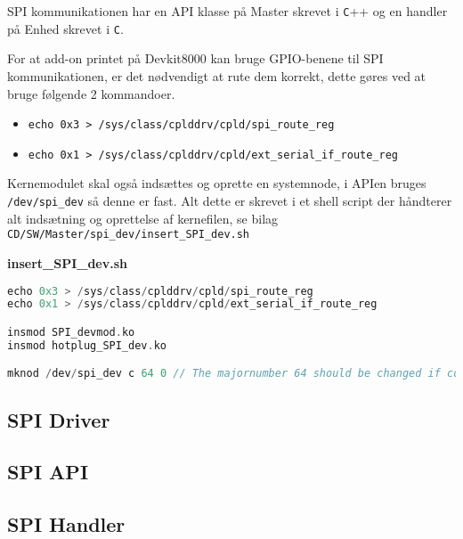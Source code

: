 


SPI kommunikationen har en API klasse på Master skrevet i \verb+C+++ og en handler på Enhed skrevet i \verb+C+.

For at add-on printet på Devkit8000 kan bruge GPIO-benene til SPI kommunikationen, er
det nødvendigt at rute dem korrekt, dette gøres ved at bruge følgende 2 kommandoer.


\begin{itemize}
\item \verb+echo 0x3 > /sys/class/cplddrv/cpld/spi_route_reg+
\item \verb+echo 0x1 > /sys/class/cplddrv/cpld/ext_serial_if_route_reg+
\end{itemize}

Kernemodulet skal også indsættes og oprette en systemnode, i APIen bruges \verb+/dev/spi_dev+ så denne er fast.
Alt dette er skrevet i et shell script der håndterer alt indsætning og oprettelse af kernefilen, se bilag \verb+CD/SW/Master/spi_dev/insert_SPI_dev.sh+

\textbf{insert\_SPI\_dev.sh}

\begin{lstlisting}[language=C]
echo 0x3 > /sys/class/cplddrv/cpld/spi_route_reg
echo 0x1 > /sys/class/cplddrv/cpld/ext_serial_if_route_reg

insmod SPI_devmod.ko
insmod hotplug_SPI_dev.ko

mknod /dev/spi_dev c 64 0 // The majornumber 64 should be changed if conflict occur
\end{lstlisting}


\subsection{SPI Driver}



\subsection{SPI API}




\subsection{SPI Handler}



